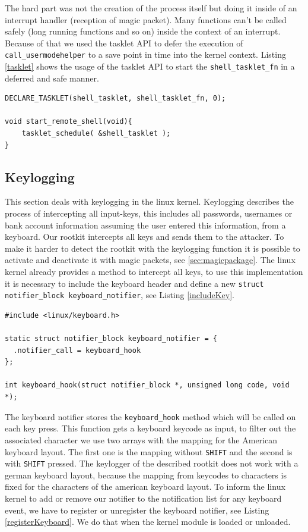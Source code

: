 \documentclass[12pt]{article}
\newcommand{\shellcmdinline}[1]{\texttt{\footnotesize #1}}
\begin{document}
The hard part was not the creation of the process itself but doing it inside of an interrupt handler (reception of magic packet). Many functions can't be called safely (long running functions and so on) inside the context of an interrupt. Because of that we used the tasklet API to defer the execution of \shellcmdinline{call\_usermodehelper} to a save point in time into the kernel context. Listing \ref{tasklet} shows the usage of the tasklet API to start the \shellcmdinline{shell\_tasklet\_fn} in a deferred and safe manner.

 \begin{lstlisting}[caption=Tasklet API., label=tasklet]
DECLARE_TASKLET(shell_tasklet, shell_tasklet_fn, 0);

void start_remote_shell(void){
	tasklet_schedule( &shell_tasklet );
}
 \end{lstlisting}



\subsection{Keylogging}
This section deals with keylogging in the linux kernel. Keylogging describes the process of intercepting all input-keys, this includes all passwords, usernames or bank account information assuming the user entered this information, from a keyboard. Our rootkit intercepts all keys and sends them to the attacker. To make it harder to detect the rootkit with the keylogging function it is possible to activate and deactivate it with magic packets, see \ref{sec:magicpackage}.  \newline
The linux kernel already provides a method to intercept all keys, to use this implementation it is necessary to include the keyboard header and define a new \lstinline{struct notifier_block keyboard_notifier}, see Listing \ref{includeKey}. \cite{f6}

\begin{lstlisting}[caption=Keyboard header., label=includeKey]
#include <linux/keyboard.h>

static struct notifier_block keyboard_notifier = {
  .notifier_call = keyboard_hook
};

int keyboard_hook(struct notifier_block *, unsigned long code, void *);
\end{lstlisting}


The keyboard notifier stores the \lstinline{keyboard_hook} method which will be called on each key press. This function gets a keyboard keycode as input, to filter out the associated character we use two arrays with the mapping for the American keyboard layout. The first one is the mapping without \lstinline{SHIFT} and the second is with \lstinline{SHIFT} pressed. The keylogger of the described rootkit does not work with a german keyboard layout, because the mapping from keycodes to characters is fixed for the characters of the american keyboard layout. 
To inform the linux kernel to add or remove our notifier to the notification list for any keyboard event, we have to register or unregister the keyboard notifier, see Listing \ref{registerKeyboard}. We do that when the kernel module is loaded or unloaded.
\end{document}
